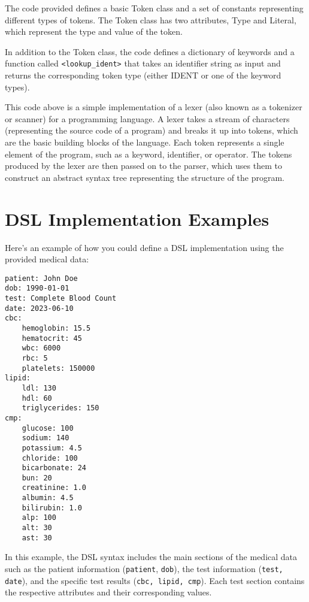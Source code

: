 The code provided defines a basic Token class and a set of constants representing different types of tokens. The Token class has two attributes, Type and Literal, which represent the type and value of the token.

In addition to the Token class, the code defines a dictionary of keywords and a function called \texttt{<lookup\_ident>} that takes an identifier string as input and returns the corresponding token type (either IDENT or one of the keyword types).

This code above is a simple implementation of a lexer (also known as a tokenizer or scanner) for a programming language. A lexer takes a stream of characters (representing the source code of a program) and breaks it up into tokens, which are the basic building blocks of the language. Each token represents a single element of the program, such as a keyword, identifier, or operator. The tokens produced by the lexer are then passed on to the parser, which uses them to construct an abstract syntax tree representing the structure of the program.

\section{DSL Implementation Examples}

Here's an example of how you could define a DSL implementation using the provided medical data:

\begin{lstlisting}
patient: John Doe
dob: 1990-01-01
test: Complete Blood Count
date: 2023-06-10
cbc:
    hemoglobin: 15.5
    hematocrit: 45
    wbc: 6000
    rbc: 5
    platelets: 150000
lipid:
    ldl: 130
    hdl: 60
    triglycerides: 150
cmp:
    glucose: 100
    sodium: 140
    potassium: 4.5
    chloride: 100
    bicarbonate: 24
    bun: 20
    creatinine: 1.0
    albumin: 4.5
    bilirubin: 1.0
    alp: 100
    alt: 30
    ast: 30
\end{lstlisting}

In this example, the DSL syntax includes the main sections of the medical data such as the patient information (\texttt{patient}, \texttt{dob}), the test information (\texttt{test, date}), and the specific test results (\texttt{cbc, lipid, cmp}). Each test section contains the respective attributes and their corresponding values.
